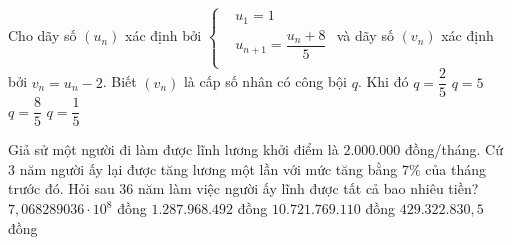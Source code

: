 \begin{ex}%
	Cho dãy số $(u_n)$ xác định bởi $\left\{\begin{aligned}
	& u_1=1 \\
	& u_{n+1}=\dfrac{u_n+8}{5} \\
	\end{aligned}\right. $ và dãy số $(v_n)$ xác định bởi $v_n=u_n-2$. Biết $(v_n)$ là cấp số nhân có công bội $q$. Khi đó
	\choice
	{$q=\dfrac{2}{5}$}
	{$q=5$}
	{$q=\dfrac{8}{5}$}
	{\True $q=\dfrac{1}{5}$}
\end{ex}%
\begin{ex}%
	Giả sử một người đi làm được lĩnh lương khởi điểm là $2.000.000$ đồng/tháng. Cứ $3$ năm người ấy lại được tăng lương một lần với mức tăng bằng $7\%$ của tháng trước đó. Hỏi sau $36$ năm làm việc người ấy lĩnh được tất cả bao nhiêu tiền?
	\choice
	{$ 7{,}068289036\cdot 10^8 $ đồng}
	{\True $ 1.287.968.492 $ đồng}
	{$ 10.721.769.110 $ đồng}
	{$ 429.322.830{,}5 $ đồng}
\end{ex}%
